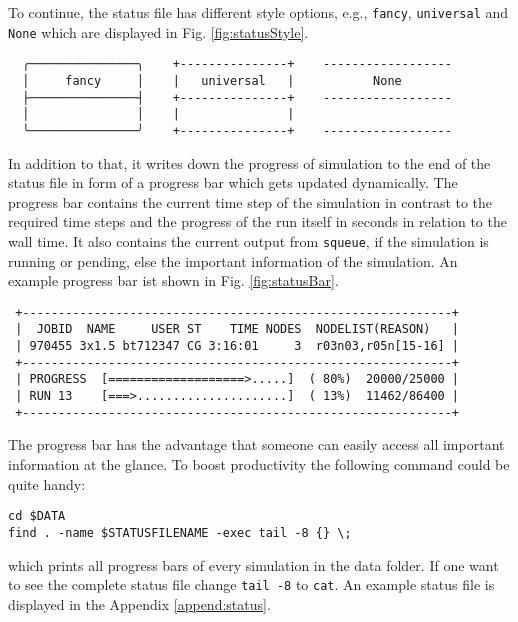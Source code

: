 To continue, the status file has different style options, e.g., \texttt{fancy}, \texttt{universal} and \texttt{None} which are displayed in Fig. \ref{fig:statusStyle}. 
\begin{center}
\captionsetup{type=figure}
\begin{verbatim}
  ╭───────────────╮    +---------------+    ------------------
  │     fancy     │    |   universal   |           None
  ├───────────────┤    +---------------+    ------------------
  │               │    |               |    
  ╰───────────────╯    +---------------+    ------------------
\end{verbatim}
\label{fig:statusStyle}
\end{center}
In addition to that, it writes down the progress of simulation to the end of the status file in form of a progress bar which gets updated dynamically. The progress bar contains the current time step of the simulation in contrast to the required time steps and the progress of the run itself in seconds in relation to the wall time. It also contains the current output from \texttt{squeue}, if the simulation is running or pending, else the important information of the simulation. An example progress bar ist shown in Fig. \ref{fig:statusBar}.
\begin{center}
\captionsetup{type=figure}
\begin{verbatim}
 +------------------------------------------------------------+
 |  JOBID  NAME     USER ST    TIME NODES  NODELIST(REASON)   |
 | 970455 3x1.5 bt712347 CG 3:16:01     3  r03n03,r05n[15-16] |
 +------------------------------------------------------------+
 | PROGRESS  [===================>.....]  ( 80%)  20000/25000 |
 | RUN 13    [===>.....................]  ( 13%)  11462/86400 |
 +------------------------------------------------------------+
\end{verbatim}
\label{fig:statusBar}
\end{center}
The progress bar has the advantage that someone can easily access all important information at the glance. To boost productivity the following command could be quite handy:
\begin{lstlisting}
cd $DATA 
find . -name $STATUSFILENAME -exec tail -8 {} \;
\end{lstlisting}
which prints all progress bars of every simulation in the data folder. If one want to see the complete status file change \texttt{tail -8} to \texttt{cat}.
An example status file is displayed in the Appendix \ref{append:status}.

